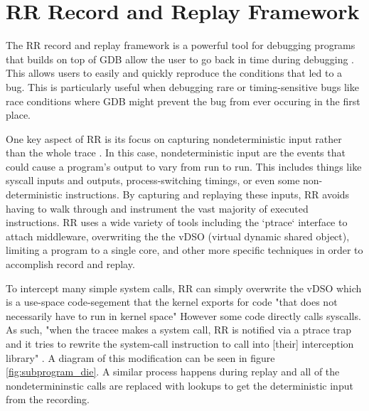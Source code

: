 \section{RR Record and Replay Framework}
The RR record and replay framework is a powerful tool for debugging programs that builds on top of GDB allow the user to go back in time during debugging \cite{rr-site}. This allows users to easily and quickly reproduce the conditions that led to a bug. This is particularly useful when debugging rare or timing-sensitive bugs like race conditions where GDB might prevent the bug from ever occuring in the first place.

One key aspect of RR is its focus on capturing nondeterministic input rather than the whole trace \cite{rr-site}. In this case, nondeterministic input are the events that could cause a program's output to vary from run to run. This includes things like syscall inputs and outputs, process-switching timings, or even some non-deterministic instructions. By capturing and replaying these inputs, RR avoids having to walk through and instrument the vast majority of executed instructions. RR uses a wide variety of tools including the `ptrace` interface to attach middleware, overwriting the the vDSO (virtual dynamic shared object), limiting a program to a single core, and other more specific techniques in order to accomplish record and replay. 

To intercept many simple system calls, RR can simply overwrite the vDSO which is a use-space code-segement that the kernel exports for code "that does not necessarily have to run in kernel space" \cite{vdso} However some code directly calls syscalls. As such, "when the tracee makes a system call, RR is notified via a ptrace trap and it tries to rewrite the system-call instruction to call into [their] interception library" \cite[p.~8]{rr}. A diagram of this modification can be seen in figure \ref{fig:subprogram_die}. A similar process happens during replay and all of the nondetermininstic calls are replaced with lookups to get the deterministic input from the recording.

